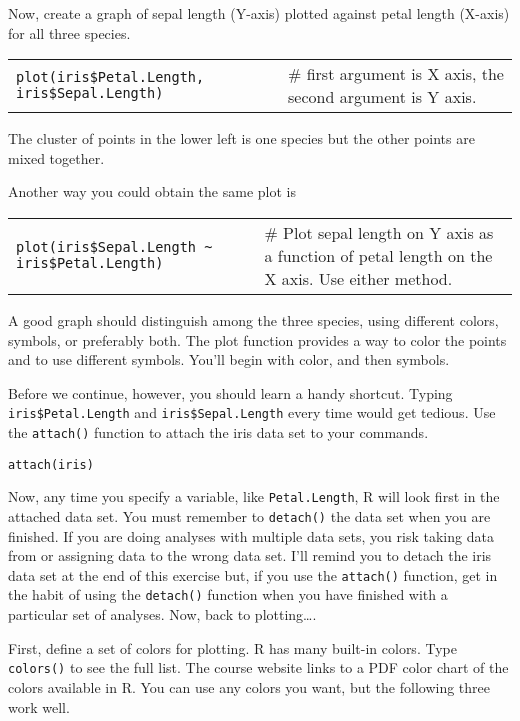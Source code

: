 \documentclass[11pt]{article}
\begin{document}
Now, create a graph of sepal length (Y-axis) plotted against petal
length (X-axis) for all three species.

\begin{tabular}{@{}L{3.5in}L{2.25in}@{}}
\texttt{plot(iris\$Petal.Length, iris\$Sepal.Length)} & \# first argument is X
axis, the second argument is Y axis.\\
\end{tabular}

The cluster of points in the lower left is one species but the other
points are mixed together.

Another way you could obtain the same plot is

\begin{tabular}{@{}L{3.5in}L{2.25in}@{}}
\texttt{plot(iris\$Sepal.Length \textasciitilde{} iris\$Petal.Length)} & \# Plot
sepal length on Y axis as a function of petal length on the X axis. Use either method.\\
\end{tabular}

A good graph should distinguish among the three species, using different
colors, symbols, or preferably both. The plot function provides a way to
color the points and to use different symbols. You'll begin with color,
and then symbols.

Before we continue, however, you should learn a handy shortcut. Typing
\texttt{iris\$Petal.Length} and \texttt{iris\$Sepal.Length} every time would get tedious.
Use the \texttt{attach()} function to attach the iris data set to your commands.

\texttt{attach(iris)}

Now, any time you specify a variable, like \texttt{Petal.Length}, R will look
first in the attached data set. You must remember to \texttt{detach()} the data
set when you are finished. If you are doing analyses with multiple data
sets, you risk taking data from or assigning data to the wrong data set.
I'll remind you to detach the iris data set at the end of this exercise
but, if you use the \texttt{attach()} function, get in the habit of using the
\texttt{detach()} function when you have finished with a particular set of
analyses. Now, back to plotting\ldots{}.

First, define a set of colors for plotting. R has many built-in colors.
Type \texttt{colors()} to see the full list. The course website links to a PDF
color chart of the colors available in R. You can use any colors you
want, but the following three work well.
\end{document}
